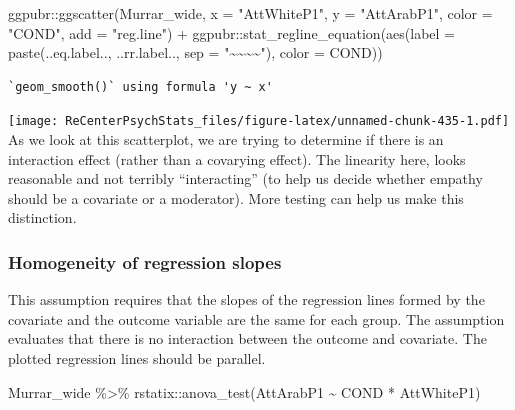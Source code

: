 \documentclass[
  11pt,
]{book}
\newenvironment{Shaded}{\begin{snugshade}}{\end{snugshade}}
\newcommand{\AttributeTok}[1]{\textcolor[rgb]{0.77,0.63,0.00}{#1}}
\newcommand{\FunctionTok}[1]{\textcolor[rgb]{0.00,0.00,0.00}{#1}}
\newcommand{\NormalTok}[1]{#1}
\newcommand{\SpecialCharTok}[1]{\textcolor[rgb]{0.00,0.00,0.00}{#1}}
\newcommand{\StringTok}[1]{\textcolor[rgb]{0.31,0.60,0.02}{#1}}
\begin{document}
\begin{Shaded}
\begin{Highlighting}[]
\NormalTok{ggpubr}\SpecialCharTok{::}\FunctionTok{ggscatter}\NormalTok{(Murrar\_wide, }\AttributeTok{x =} \StringTok{"AttWhiteP1"}\NormalTok{, }\AttributeTok{y =} \StringTok{"AttArabP1"}\NormalTok{, }\AttributeTok{color =} \StringTok{"COND"}\NormalTok{,}
    \AttributeTok{add =} \StringTok{"reg.line"}\NormalTok{) }\SpecialCharTok{+}\NormalTok{ ggpubr}\SpecialCharTok{::}\FunctionTok{stat\_regline\_equation}\NormalTok{(}\FunctionTok{aes}\NormalTok{(}\AttributeTok{label =} \FunctionTok{paste}\NormalTok{(..eq.label..,}
\NormalTok{    ..rr.label.., }\AttributeTok{sep =} \StringTok{"\textasciitilde{}\textasciitilde{}\textasciitilde{}\textasciitilde{}"}\NormalTok{), }\AttributeTok{color =}\NormalTok{ COND))}
\end{Highlighting}
\end{Shaded}

\begin{verbatim}
`geom_smooth()` using formula 'y ~ x'
\end{verbatim}

\texttt{[image: ReCenterPsychStats\_files/figure-latex/unnamed-chunk-435-1.pdf]}
As we look at this scatterplot, we are trying to determine if there is an interaction effect (rather than a covarying effect). The linearity here, looks reasonable and not terribly ``interacting'' (to help us decide whether empathy should be a covariate or a moderator). More testing can help us make this distinction.

\hypertarget{homogeneity-of-regression-slopes-1}{%
\subsubsection{Homogeneity of regression slopes}\label{homogeneity-of-regression-slopes-1}}

This assumption requires that the slopes of the regression lines formed by the covariate and the outcome variable are the same for each group. The assumption evaluates that there is no interaction between the outcome and covariate. The plotted regression lines should be parallel.

\begin{Shaded}
\begin{Highlighting}[]
\NormalTok{Murrar\_wide }\SpecialCharTok{\%\textgreater{}\%}
\NormalTok{    rstatix}\SpecialCharTok{::}\FunctionTok{anova\_test}\NormalTok{(AttArabP1 }\SpecialCharTok{\textasciitilde{}}\NormalTok{ COND }\SpecialCharTok{*}\NormalTok{ AttWhiteP1)}
\end{Highlighting}
\end{Shaded}
\end{document}
